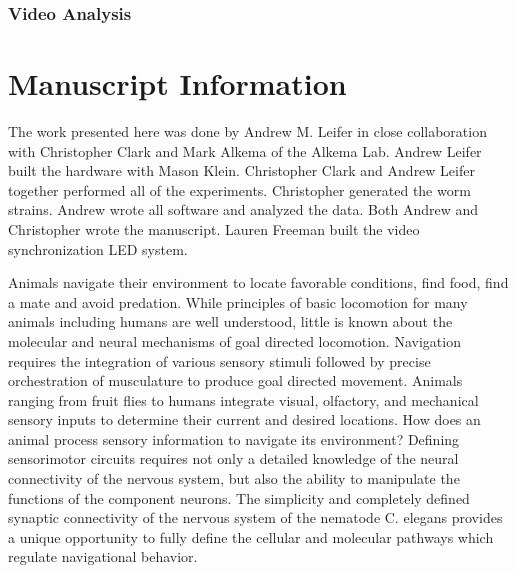 \subsubsection{Video Analysis}





\section{Manuscript Information}
The work presented here was done by Andrew M. Leifer in close collaboration with Christopher Clark and Mark Alkema of the Alkema Lab. Andrew Leifer built the hardware with Mason Klein. Christopher Clark and Andrew Leifer together performed all of the experiments. Christopher generated the worm strains. Andrew wrote all software and analyzed the data. Both Andrew and Christopher wrote the manuscript. Lauren Freeman built the video synchronization LED system. 






Animals navigate their environment to locate favorable conditions, find food, find a mate and avoid predation. While principles of basic locomotion for many animals including humans are well understood, little is known about the molecular and neural mechanisms of goal directed locomotion.  Navigation requires the integration of various sensory stimuli followed by precise orchestration of musculature to produce goal directed movement.  Animals ranging from fruit flies to humans integrate visual, olfactory, and mechanical sensory inputs to determine their current and desired locations.  How does an animal process sensory information to navigate its environment?  Defining sensorimotor circuits requires not only a detailed knowledge of the neural connectivity of the nervous system, but also the ability to manipulate the functions of the component neurons. The simplicity and completely defined synaptic connectivity of the nervous system of the nematode C. elegans provides a unique opportunity to fully define the cellular and molecular pathways which regulate navigational behavior.

